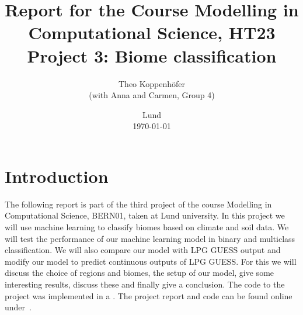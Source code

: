 





\usepackage[margin=1.3in]{geometry}

\title{ Report for the Course Modelling in Computational Science, HT23 \\[1ex]
	  \large Project 3: Biome classification}
\author{Theo Koppenhöfer \\[1ex] (with Anna and Carmen, Group 4)}
\date{Lund \\[1ex] \today}



\graphicspath{{../Project3RandomForestML/plots/}}




\usepackage{pythonhighlight}



\maketitle

\section{Introduction}
The following report is part of the third project of the course Modelling in Computational Science, BERN01, taken at Lund university.
In this project we will use machine learning to classify biomes based on climate and soil data. We will test the performance of our machine
learning model in binary and multiclass classification. We will also compare our model with LPG GUESS output
and modify our model to predict continuous outputs of LPG GUESS.
For this we will discuss the choice of regions and biomes, the setup of our model, give some interesting results, discuss these and finally give a conclusion.
The code to the project was implemented in a .
The project report and code can be found online under~\cite{Repository}.


